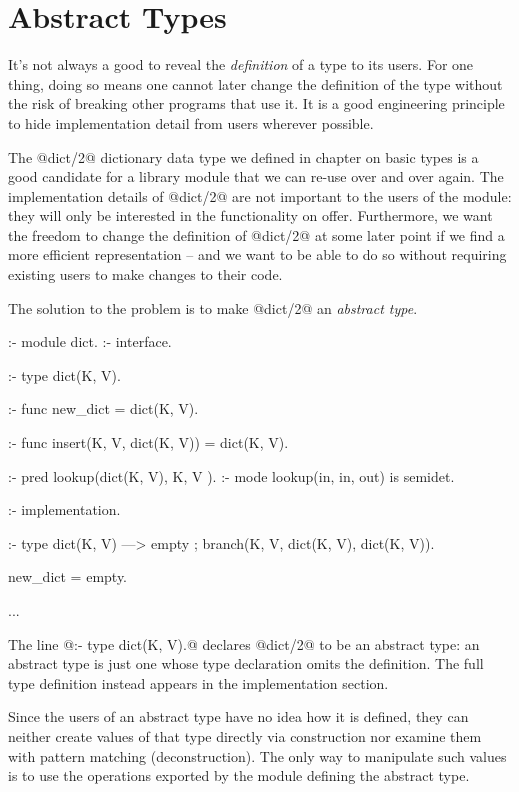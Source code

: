 \section{Abstract Types}


It's not always a good to reveal the \emph{definition} of a type to its
users.  For one thing, doing so means one cannot later change the
definition of the type without the risk of breaking other programs that use
it.  It is a good engineering principle to hide 
implementation detail from users wherever possible.

The @dict/2@ dictionary data type we defined in chapter \XXX{} on basic
types is a good candidate for a library module that we can re-use over and
over again.  The implementation details of @dict/2@ are not important to the
users of the module: they will only be interested in the functionality on
offer.  Furthermore, we want the freedom to change the definition of
@dict/2@ at some later point if we find a more efficient representation --
and we want to be able to do so without requiring existing users to make
changes to their code.

The solution to the problem is to make @dict/2@ an \emph{abstract type}.
\begin{myverbatim}
:- module dict.
:- interface.


:- type dict(K, V).     %

:- func new_dict = dict(K, V).

:- func insert(K, V, dict(K, V)) = dict(K, V).

:- pred lookup(dict(K, V), K,  V  ).
:- mode lookup(in,         in, out) is semidet.


:- implementation.


:- type dict(K, V)      %
    --->    empty
    ;       branch(K, V, dict(K, V), dict(K, V)).

new_dict = empty.

...
\end{myverbatim}
The line @:- type dict(K, V).@ declares @dict/2@ to be an abstract type:
an abstract type is just one whose type declaration omits the definition.
The full type definition instead appears in the implementation section.

Since the users of an abstract type have no idea how it is defined, they can
neither create values of that type directly via construction nor examine
them with pattern matching (deconstruction).  The only way to manipulate
such values is to use the operations exported by the module defining the
abstract type.

